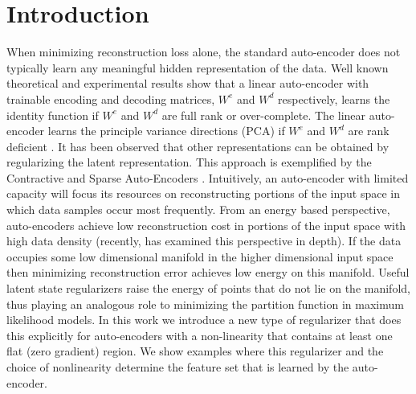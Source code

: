 \section{Introduction} 
When minimizing reconstruction loss alone, the standard auto-encoder
does not typically learn any meaningful hidden representation of the data. Well
known theoretical and experimental results show that a linear auto-encoder with
trainable encoding and decoding matrices, $W^e$ and $W^d$ respectively, learns
the identity function if $W^e$ and $W^d$ are full rank or over-complete. The
linear auto-encoder learns the principle variance directions (PCA) if $W^e$ and
$W^d$ are rank deficient \cite{DHS}. It has been observed that other
representations can be obtained by regularizing the latent representation. This
approach is exemplified by the Contractive and Sparse Auto-Encoders \cite{CAE}
\cite{SAE1} \cite{SAE2}. Intuitively, an auto-encoder with limited capacity
will focus its resources on reconstructing portions of the input space in which
data samples occur most frequently. From an energy based perspective,
auto-encoders achieve low reconstruction cost in portions of the input space
with high data density (recently, \cite{bengio_new} has examined this
perspective in depth). If the data occupies some low dimensional manifold in
the higher dimensional input space then minimizing reconstruction error
achieves low energy on this manifold. Useful latent state regularizers raise
the energy of points that do not lie on the manifold, thus playing an analogous
role to minimizing the partition function in maximum likelihood models. In this
work we introduce a new type of regularizer that does this explicitly for
auto-encoders with a non-linearity that contains at least one flat (zero
gradient) region. We show examples where this regularizer and the choice of
nonlinearity determine the feature set that is learned by the auto-encoder.      

